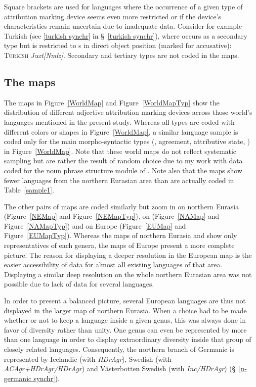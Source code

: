 Square brackets are used for languages where the occurrence of a given type of attribution marking device seems even more restricted or if the device's characteristics remain uncertain due to inadequate data. Consider for example Turkish (see \ref{turkish synchr} in \S~\ref{turkish synchr}), where  occurs as a secondary type but is restricted to s in direct object position (marked for accusative): \textsc{Turkish} \textit{Juxt[Nmlz]}. 
Secondary and tertiary types are not coded in the maps. 

\subsection{The maps}
The maps in Figure~\ref{WorldMap} and Figure~\ref{WorldMapTyp} show the distribution of different adjective attribution marking devices across those world's languages mentioned in the present study. Whereas all types are coded with different colors or shapes in Figure~\ref{WorldMap}, a similar language sample is coded only for the main morpho-syntactic types (, agreement, attributive state, ) in Figure~\ref{WorldMap}. Note that these world maps do not reflect systematic sampling but are rather the result of random choice due to my work with data coded for the noun phrase structure module of  \citep{AUTOTYP-NP}. Note also that the maps show fewer languages from the northern Eurasian area than are actually coded in Table~\ref{sample1}.

The other pairs of maps are coded similarly but zoom in on northern Eurasia (Figure~\ref{NEMap} and Figure~\ref{NEMapTyp}), on  (Figure~\ref{NAMap} and Figure~\ref{NAMapTyp}) and on Europe (Figure~\ref{EUMap} and Figure~\ref{EUMapTyp}). Whereas the maps of northern Eurasia and  show only representatives of each genera, the maps of Europe present a more complete picture. The reason for displaying a deeper resolution in the European map is the easier accessibility of data for almost all existing languages of that area. Displaying a similar deep resolution on the whole northern Eurasian area was not possible due to lack of data for several languages.

In order to present a balanced picture, several European languages are thus not displayed in the larger map of northern Eurasia. When a choice had to be made whether or not to keep a language inside a given genus, this was always done in favor of diversity rather than unity. One genus can even be represented by more than one language in order to display extraordinary diversity inside that group of closely related languages. Consequently, the northern branch of Germanic is represented by Icelandic (with \textit{HDrAgr}), Swedish (with \textit{ACAgr+HDrAgr/HDrAgr}) and Västerbotten Swedish (with \textit{Inc/HDrAgr}) (\S~\ref{n-germanic synchr}).

